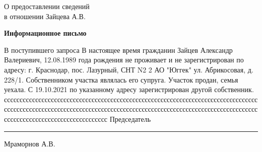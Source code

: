 \begin{flushleft}
	\vspace{10mm}
О предоставлении сведений\\
в отношении Зайцева  А.В.
\end{flushleft}
\vspace{7mm}
\begin{center}
	\Large\textbf{Информационное письмо}
\end{center}
\par

В поступившего запроса В настоящее время гражданин Зайцев Александр Валериевич, 12.08.1989 года рождения не проживает и не зарегистрирован по адресу:  г. Краснодар, пос. Лазурный, СНТ N2 2 АО "Юггек" ул. Абрикосовая, д. 228/1.  Собственником участка являлась его супруга. Участок продан, семья уехала. С 19.10.2021   по указанному адресу зарегистрирован другой собственник. 
ссссссссссссссссссссссссссссссссссссссссссссссссссссссссссссссссссссссссссссссссссссссссссссссссссссссссссссссссссссссссссссссссссссссссссссссссссссссссссссссссссссссссссссссссссссссссссссссссссс
\vspace{35mm}
Председатель \hfill    \rule{4cm}{0.1 mm}    Мраморнов А.В.




